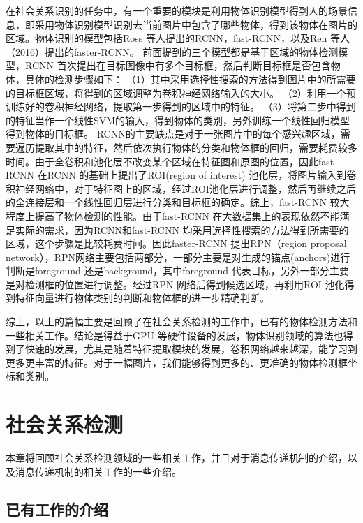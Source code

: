在社会关系识别的任务中，有一个重要的模块是利用物体识别模型得到人的场景信息，即采用物体识别模型识别去当前图片中包含了哪些物体，得到该物体在图片的区域。物体识别的模型包括Ross 等人提出的RCNN\cite{girshick2014rich}，fast-RCNN\cite{girshick2015fast}，以及Ren 等人（2016）\cite{ren2015faster}提出的faster-RCNN。 前面提到的三个模型都是基于区域的物体检测模型，RCNN\cite{girshick2014rich} 首次提出在目标图像中有多个目标框，然后判断目标框是否包含物体，具体的检测步骤如下：
（1）其中采用选择性搜索的方法得到图片中的所需要的目标框区域，将得到的区域调整为卷积神经网络输入的大小。
（2）利用一个预训练好的卷积神经网络，提取第一步得到的区域中的特征。
（3）将第二步中得到的特征当作一个线性SVM的输入，得到物体的类别，另外训练一个线性回归模型得到物体的目标框。
RCNN的主要缺点是对于一张图片中的每个感兴趣区域，需要遍历提取其中的特征，然后依次执行物体的分类和物体框的回归，需要耗费较多时间。由于全卷积和池化层不改变某个区域在特征图和原图的位置，因此fast-RCNN 在RCNN 的基础上提出了ROI(region of interest) 池化层，将图片输入到卷积神经网络中，对于特征图上的区域，经过ROI池化层进行调整，然后再继续之后的全连接层和一个线性回归层进行分类和目标框的确定。综上，fast-RCNN 较大程度上提高了物体检测的性能。由于fast-RCNN 在大数据集上的表现依然不能满足实际的需求，因为RCNN和fast-RCNN 均采用选择性搜索的方法得到所需要的区域，这个步骤是比较耗费时间。因此faster-RCNN 提出RPN（region proposal network），RPN网络主要包括两部分，一部分主要是对生成的锚点(anchors)进行判断是foreground 还是background，其中foreground 代表目标，另外一部分主要是对检测框的位置进行调整。经过RPN 网络后得到候选区域，再利用ROI 池化得到特征向量进行物体类别的判断和物体框的进一步精确判断。


综上，以上的篇幅主要是回顾了在社会关系检测的工作中，已有的物体检测方法和一些相关工作。结论是得益于GPU 等硬件设备的发展，物体识别领域的算法也得到了快速的发展，尤其是随着特征提取模块的发展，卷积网络越来越深，能学习到更多更丰富的特征。对于一幅图片，我们能够得到更多的、更准确的物体检测框坐标和类别。

\section{社会关系检测}
本章将回顾社会关系检测领域的一些相关工作，并且对于消息传递机制的介绍，以及消息传递机制的相关工作的一些介绍。

\subsection{已有工作的介绍}

